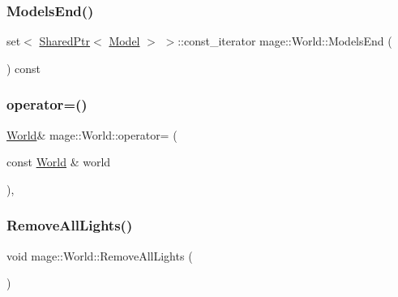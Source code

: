\hypertarget{classmage_1_1_world_ad7e9615a659dad4190b16dc28932c007}{}\label{classmage_1_1_world_ad7e9615a659dad4190b16dc28932c007} 
\subsubsection{\texorpdfstring{Models\+End()}{ModelsEnd()}\hspace{0.1cm}{\footnotesize\ttfamily [2/2]}}
{\footnotesize\ttfamily set$<$ \hyperlink{namespacemage_a1e01ae66713838a7a67d30e44c67703e}{Shared\+Ptr}$<$ \hyperlink{classmage_1_1_model}{Model} $>$ $>$\+::const\+\_\+iterator mage\+::\+World\+::\+Models\+End (\begin{DoxyParamCaption}{ }\end{DoxyParamCaption}) const}

\hypertarget{classmage_1_1_world_aa7074e3847c9fbe1466aa833f194eed0}{}\label{classmage_1_1_world_aa7074e3847c9fbe1466aa833f194eed0} 
\subsubsection{\texorpdfstring{operator=()}{operator=()}}
{\footnotesize\ttfamily \hyperlink{classmage_1_1_world}{World}\& mage\+::\+World\+::operator= (\begin{DoxyParamCaption}\item[{const \hyperlink{classmage_1_1_world}{World} \&}]{world }\end{DoxyParamCaption})\hspace{0.3cm}{\ttfamily [private]}, {\ttfamily [delete]}}

\hypertarget{classmage_1_1_world_a5fafe529414d511e88b98ccd8e2f951f}{}\label{classmage_1_1_world_a5fafe529414d511e88b98ccd8e2f951f} 
\subsubsection{\texorpdfstring{Remove\+All\+Lights()}{RemoveAllLights()}}
{\footnotesize\ttfamily void mage\+::\+World\+::\+Remove\+All\+Lights (\begin{DoxyParamCaption}{ }\end{DoxyParamCaption})}

